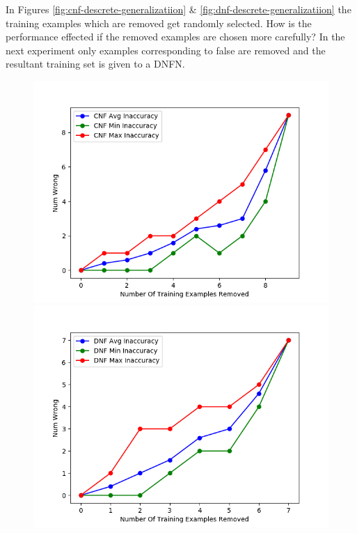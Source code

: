 In Figures \ref{fig:cnf-descrete-generalizatiion} \& \ref{fig:dnf-descrete-generalizatiion} the training examples which are removed get randomly selected. How is the performance effected if the removed examples are chosen more carefully? In the next experiment only examples corresponding to false are removed and the resultant training set is given to a DNFN.

\begin{figure}[H]
	\centering
	\begin{minipage}[b]{0.45\textwidth}
		\includegraphics[width=\textwidth]{cnf-descrete-generalization-partial.png}
		\caption{}
		\label{fig:cnf-descrete-generalizatiion-partial}
	\end{minipage}
	\begin{minipage}[b]{0.45\textwidth}
		\includegraphics[width=\textwidth]{dnf-descrete-generalization-partial.png}
		\caption{}
		\label{fig:dnf-descrete-generalizatiion-partial}
	\end{minipage}
	\hfill
\end{figure}

